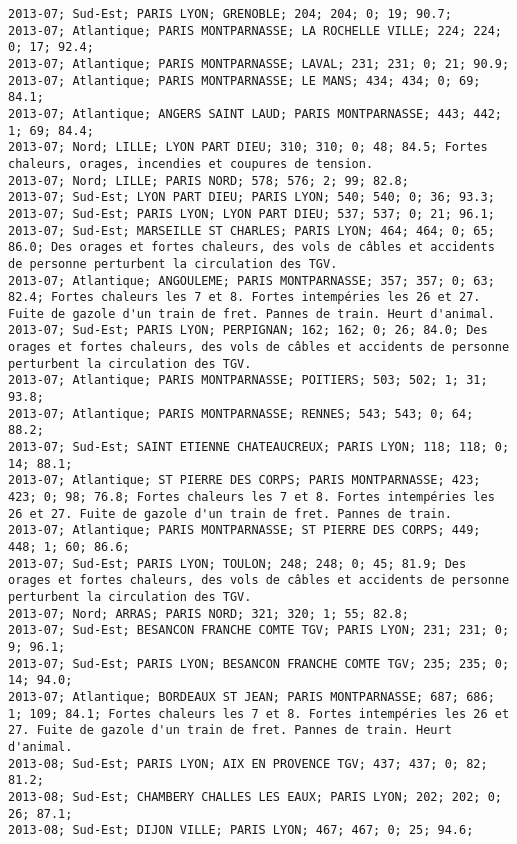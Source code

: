 \documentclass{article}
\begin{document}
\begin{Verbatim}[commandchars=\\\{\}]
2013-07; Sud-Est; PARIS LYON; GRENOBLE; 204; 204; 0; 19; 90.7; 
2013-07; Atlantique; PARIS MONTPARNASSE; LA ROCHELLE VILLE; 224; 224; 0; 17; 92.4; 
2013-07; Atlantique; PARIS MONTPARNASSE; LAVAL; 231; 231; 0; 21; 90.9; 
2013-07; Atlantique; PARIS MONTPARNASSE; LE MANS; 434; 434; 0; 69; 84.1; 
2013-07; Atlantique; ANGERS SAINT LAUD; PARIS MONTPARNASSE; 443; 442; 1; 69; 84.4; 
2013-07; Nord; LILLE; LYON PART DIEU; 310; 310; 0; 48; 84.5; Fortes chaleurs, orages, incendies et coupures de tension.
2013-07; Nord; LILLE; PARIS NORD; 578; 576; 2; 99; 82.8; 
2013-07; Sud-Est; LYON PART DIEU; PARIS LYON; 540; 540; 0; 36; 93.3; 
2013-07; Sud-Est; PARIS LYON; LYON PART DIEU; 537; 537; 0; 21; 96.1; 
2013-07; Sud-Est; MARSEILLE ST CHARLES; PARIS LYON; 464; 464; 0; 65; 86.0; Des orages et fortes chaleurs, des vols de câbles et accidents de personne perturbent la circulation des TGV.
2013-07; Atlantique; ANGOULEME; PARIS MONTPARNASSE; 357; 357; 0; 63; 82.4; Fortes chaleurs les 7 et 8. Fortes intempéries les 26 et 27. Fuite de gazole d'un train de fret. Pannes de train. Heurt d'animal.
2013-07; Sud-Est; PARIS LYON; PERPIGNAN; 162; 162; 0; 26; 84.0; Des orages et fortes chaleurs, des vols de câbles et accidents de personne perturbent la circulation des TGV.
2013-07; Atlantique; PARIS MONTPARNASSE; POITIERS; 503; 502; 1; 31; 93.8; 
2013-07; Atlantique; PARIS MONTPARNASSE; RENNES; 543; 543; 0; 64; 88.2; 
2013-07; Sud-Est; SAINT ETIENNE CHATEAUCREUX; PARIS LYON; 118; 118; 0; 14; 88.1; 
2013-07; Atlantique; ST PIERRE DES CORPS; PARIS MONTPARNASSE; 423; 423; 0; 98; 76.8; Fortes chaleurs les 7 et 8. Fortes intempéries les 26 et 27. Fuite de gazole d'un train de fret. Pannes de train.
2013-07; Atlantique; PARIS MONTPARNASSE; ST PIERRE DES CORPS; 449; 448; 1; 60; 86.6; 
2013-07; Sud-Est; PARIS LYON; TOULON; 248; 248; 0; 45; 81.9; Des orages et fortes chaleurs, des vols de câbles et accidents de personne perturbent la circulation des TGV.
2013-07; Nord; ARRAS; PARIS NORD; 321; 320; 1; 55; 82.8; 
2013-07; Sud-Est; BESANCON FRANCHE COMTE TGV; PARIS LYON; 231; 231; 0; 9; 96.1; 
2013-07; Sud-Est; PARIS LYON; BESANCON FRANCHE COMTE TGV; 235; 235; 0; 14; 94.0; 
2013-07; Atlantique; BORDEAUX ST JEAN; PARIS MONTPARNASSE; 687; 686; 1; 109; 84.1; Fortes chaleurs les 7 et 8. Fortes intempéries les 26 et 27. Fuite de gazole d'un train de fret. Pannes de train. Heurt d'animal.
2013-08; Sud-Est; PARIS LYON; AIX EN PROVENCE TGV; 437; 437; 0; 82; 81.2; 
2013-08; Sud-Est; CHAMBERY CHALLES LES EAUX; PARIS LYON; 202; 202; 0; 26; 87.1; 
2013-08; Sud-Est; DIJON VILLE; PARIS LYON; 467; 467; 0; 25; 94.6; 

\end{Verbatim}
\end{document}
